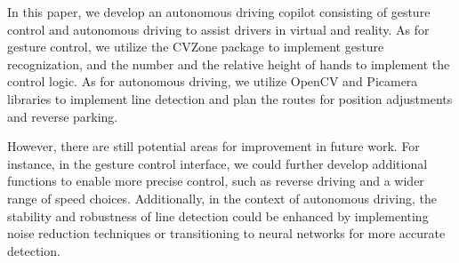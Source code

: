 \documentclass[acmsmall]{acmart}
\begin{document}
In this paper, we develop an autonomous driving copilot consisting of gesture control and autonomous driving to assist drivers in virtual and reality. As for gesture control, we utilize the CVZone package to implement gesture recognization, and the number and the relative height of hands to implement the control logic. As for autonomous driving, we utilize OpenCV and Picamera libraries to implement line detection and plan the routes for position adjustments and reverse parking. 

However, there are still potential areas for improvement in future work. For instance, in the gesture control interface, we could further develop additional functions to enable more precise control, such as reverse driving and a wider range of speed choices. Additionally, in the context of autonomous driving, the stability and robustness of line detection could be enhanced by implementing noise reduction techniques or transitioning to neural networks for more accurate detection.



\end{document}
